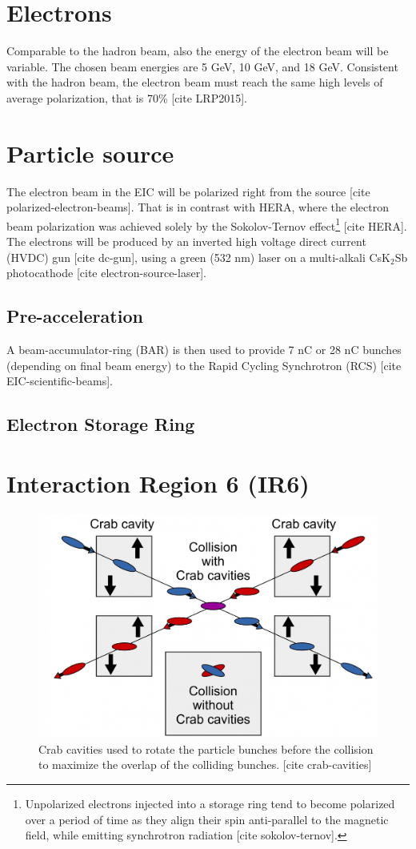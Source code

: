 
\section{Electrons}
Comparable to the hadron beam, also the energy of the electron beam will be variable. The chosen beam energies are 5 GeV, 10 GeV, and 18 GeV. Consistent with the hadron beam, the electron beam must reach the same high levels of average polarization, that is 70\% [cite LRP2015]. 

\section{Particle source}
The electron beam in the EIC will be polarized right from the source [cite polarized-electron-beams]. That is in contrast with HERA, where the electron beam polarization was achieved solely by the Sokolov-Ternov effect\footnote{Unpolarized electrons injected into a storage ring tend to become polarized over a period of time as they align their spin anti-parallel to the magnetic field, while emitting synchrotron radiation [cite sokolov-ternov].} [cite HERA]. The electrons will be produced by an inverted high voltage direct current (HVDC) gun [cite dc-gun], using a green (532 nm) laser on a multi-alkali CsK$_2$Sb photocathode [cite electron-source-laser]. 

\subsection{Pre-acceleration}

A beam-accumulator-ring (BAR) is then used to provide 7 nC or 28 nC bunches (depending on final beam energy) to the Rapid Cycling Synchrotron (RCS) [cite EIC-scientific-beams]. 

\subsection{Electron Storage Ring}

\section{Interaction Region 6 (IR6)}

\begin{figure}[ht]
    \centering
    \includegraphics[width=.7\linewidth]{img/crab_cavities.jpg}
    \caption{Crab cavities used to rotate the particle bunches before the collision to maximize the overlap of the colliding bunches. [cite crab-cavities]}
    \label{fig:eic:crab}
\end{figure}

